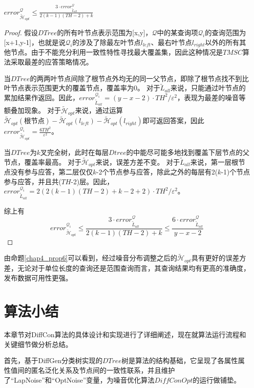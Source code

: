 \begin{prop}
	\label{chap4_prop6}
	$error_{\tilde{\mathcal{H}}_{opt}}^{\mathcal{Q}} \leqslant \frac{3 \cdotp error_{\tilde{L}_{all}}^{\mathcal{Q}}}{2(k-1)(TH-2)+k}$
\end{prop}
\begin{proof}
	假设$DTree$的所有叶节点表示范围为[x,y]，$\mathcal{Q}$中的某查询项$\mathcal{Q}_{i}$的查询范围为[x+1,y-1]，也就是说$\mathcal{Q}_{i}$的涉及了除最左叶节点$l_{left}$、最右叶节点$l_{right}$以外的所有其他节点。由于不能充分利用一致性特性寻找最大覆盖集，因此这种情况是$TMSC$算法采取最差的应答策略情况。
	
	当$DTree$的两两叶节点间除了根节点外均无的同一父节点，即除了根节点找不到比叶节点表示范围更大的覆盖节点，覆盖率为0。
	对于$\tilde{L}_{all}$来说，只能通过叶节点的累加结果作返回。因此，$error_{\tilde{L}_{all}}^{\mathcal{Q}_{i}} = (y-x-2) \cdotp TH^2/\varepsilon^2$，表现为最差的噪音等额叠加现象。
	对于$\tilde{\mathcal{H}}_{opt}$来说，通过运算$\tilde{\mathcal{H}}_{opt}(\text{根节点}) - \tilde{\mathcal{H}}_{opt}(l_{left}) - \tilde{\mathcal{H}}_{opt}(l_{right})$即可返回答案，因此$error_{\tilde{\mathcal{H}}_{opt}}^{\mathcal{Q}_{i}} = \frac{6TH^2}{\varepsilon^2}$。
	
	当$DTree$为$k$叉完全树，此时在每层$Dtree$的中能尽可能多地找到覆盖下层节点的父节点，覆盖率最高。
	对于$\tilde{\mathcal{H}}_{opt}$来说，误差方差不变。
	对于$\tilde{L}_{all}$来说，第一层根节点没有参与应答，第二层仅仅$k$-2个节点参与应答，除此之外的每层有2($k$-1)个节点参与应答，并且共($TH$-2)层。因此，$error_{\tilde{L}_{all}}^{\mathcal{Q}_{i}} = 2(2(k-1)(TH-2)+k-2+2) \cdotp TH^2/\varepsilon^2$。
	
	综上有
	\[
		error_{\tilde{\mathcal{H}}_{opt}}^{\mathcal{Q}_{i}} \leqslant \frac{3 \cdotp error_{\tilde{L}_{all}}^{\mathcal{Q}}}{2(k-1)(TH-2)+k} \leqslant \frac{6 \cdotp error_{\tilde{L}_{all}}^{\mathcal{Q}}}{y-x-2}
	\]
\end{proof}

由命题\ref{chap4_prop6}可以看到，经过噪音分布调整之后的$\tilde{\mathcal{H}}_{opt}$具有更好的误差方差，无论对于单位长度的查询还是范围查询而言，其查询结果均有更高的准确度，发布数据可用性更强。

\section{算法小结}

本章节对DiffCon算法的具体设计和实现进行了详细阐述，现在就算法运行流程和关键细节做分析总结。

首先，基于DiffGen分类树实现的$DTree$树是算法的结构基础，它呈现了各属性属性值间的匿名泛化关系及节点间的一致性联系，并且维护了“LapNoise”和“OptNoise”变量，为噪音优化算法$DiffConOpt$的运行做铺垫。

